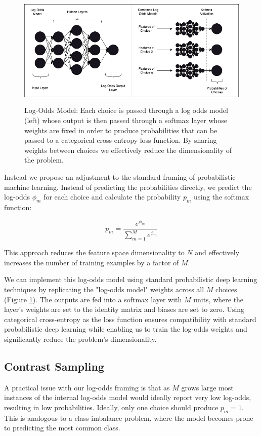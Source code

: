 \documentclass[11pt]{article}
\begin{document}
\begin{figure}[h!] 
	\centering
  \includegraphics[height=55mm]{figures/log_odds.png}
  \caption{Log-Odds Model: Each choice is passed through a log odds model (left) whose output is then passed through a softmax layer whose weights are fixed in order to produce probabilities that can be passed to a categorical cross entropy loss function. By sharing weights between choices we effectively reduce the dimensionality of the problem. }
  \label{fig:log_odds}
\end{figure}

\FloatBarrier


Instead we propose an adjustment to the standard framing of probabilistic machine learning. Instead of predicting the probabilities directly, we predict the log-odds $\phi_m$ for each choice and calculate the probability $p_m$ using the softmax function:

$$p_m = \frac{e^{\phi_m}}{\sum_{m=1}^{M}e^{\phi_m}}$$

This approach reduces the feature space dimensionality to $N$ and effectively increases the number of training examples by a factor of $M$.

We can implement this log-odds model using standard probabilistic deep learning techniques by replicating the "log-odds model" weights across all $M$ choices (Figure \ref{fig:log_odds}). The outputs are fed into a softmax layer with $M$ units, where the layer's weights are set to the identity matrix and biases are set to zero. Using categorical cross-entropy as the loss function ensures compatibility with standard probabilistic deep learning while enabling us to train the log-odds weights and significantly reduce the problem's dimensionality.

\subsection*{Contrast Sampling}

A practical issue with our log-odds framing is that as $M$ grows large most instances of the internal log-odds model would ideally report very low log-odds, resulting in low probabilities. Ideally, only one choice should produce $p_m=1$. This is analogous to a class imbalance problem, where the model becomes prone to predicting the most common class.
\end{document}
